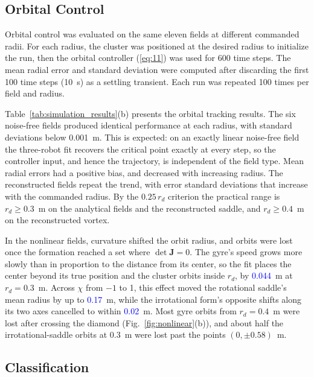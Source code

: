 \documentclass[lettersize,journal]{IEEEtran}
\newcommand{\rev}[1]{#1}
\newcommand{\newnum}[1]{\textcolor{blue}{#1}}
\begin{document}
\subsection{Orbital Control}

Orbital control was evaluated on the same eleven fields at different commanded radii. For each radius, the cluster was positioned at the desired radius to initialize the run, then the orbital controller (\ref{eq:11}) was used for 600 time steps. The mean radial error and standard deviation were computed after discarding the first 100 time steps (10~s) as a settling transient. Each run was repeated \rev{100} times per field and radius.


    Table~\ref{tab:simulation_results}(b) presents the orbital tracking results. The six noise-free fields produced identical performance at each radius, with standard deviations below \rev{0.001}~m. This is expected: on an exactly linear noise-free field the three-robot fit recovers the critical point exactly at every step, so the controller input, and hence the trajectory, is independent of the field type. Mean radial errors had a positive bias, and decreased with increasing radius. The reconstructed fields repeat the trend, with error standard deviations that increase with the commanded radius. By the $0.25\,r_d$ criterion the practical range is $r_d \ge \rev{0.3}$~m on the analytical fields and the reconstructed saddle, and $r_d \ge \rev{0.4}$~m on the reconstructed vortex.

In the nonlinear fields, curvature shifted the orbit radius, and orbits were lost once the formation reached a set where $\det\mathbf{J} = 0$. The gyre's speed grows more slowly than in proportion to the distance from its center, so the fit places the center beyond its true position and the cluster orbits inside $r_d$, by \newnum{0.044}~m at $r_d = 0.3$~m. Across $\chi$ from $-1$ to 1, this effect moved the rotational saddle's mean radius by up to \newnum{0.17}~m, while the irrotational form's opposite shifts along its two axes cancelled to within \newnum{0.02}~m. Most gyre orbits from $r_d = 0.4$~m were lost after crossing the diamond (Fig.~\ref{fig:nonlinear}(b)), and about half the irrotational-saddle orbits at 0.3~m were lost past the points $(0, \pm 0.58)$~m.

\subsection{Classification}
\end{document}
